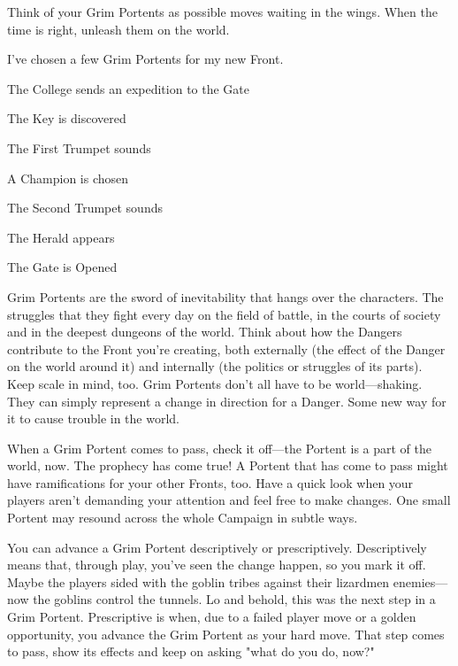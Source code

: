        

Think of your Grim Portents as possible moves waiting in the wings. When the time is right, unleash them on the world.

       
\startExample
I've chosen a few Grim Portents for my new Front. 
\startitemize[1,packed]

\item The College sends an expedition to the Gate


\item The Key is discovered


\item The First Trumpet sounds


\item A Champion is chosen


\item The Second Trumpet sounds


\item The Herald appears


\item The Gate is Opened


\stopitemize

\stopExample
       

Grim Portents are the sword of inevitability that hangs over the characters. The struggles that they fight every day on the field of battle, in the courts of society and in the deepest dungeons of the world. Think about how the Dangers contribute to the Front you're creating, both externally (the effect of the Danger on the world around it) and internally (the politics or struggles of its parts). Keep scale in mind, too. Grim Portents don’t all have to be world—shaking. They can simply represent a change in direction for a Danger. Some new way for it to cause trouble in the world.

       

When a Grim Portent comes to pass, check it off—the Portent is a part of the world, now. The prophecy has come true! A Portent that has come to pass might have ramifications for your other Fronts, too. Have a quick look when your players aren’t demanding your attention and feel free to make changes. One small Portent may resound across the whole Campaign in subtle ways.

       

You can advance a Grim Portent descriptively or prescriptively. Descriptively means that, through play, you've seen the change happen, so you mark it off. Maybe the players sided with the goblin tribes against their lizardmen enemies—now the goblins control the tunnels. Lo and behold, this was the next step in a Grim Portent. Prescriptive is when, due to a failed player move or a golden opportunity, you advance the Grim Portent as your hard move. That step comes to pass, show its effects and keep on asking "what do you do, now?"


